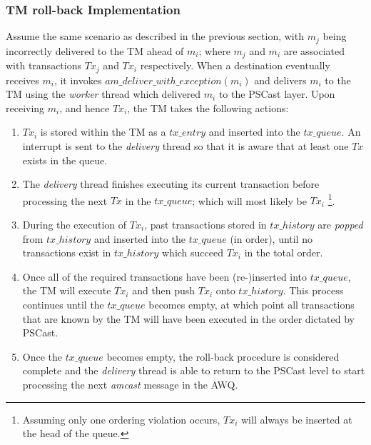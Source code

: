     \subsubsection*{TM roll-back Implementation}
    Assume the same scenario as described in the previous section, with $m_j$ being incorrectly delivered to the TM ahead of $m_i$; where $m_j$ and $m_i$ are associated with transactions $Tx_j$ and $Tx_i$ respectively.  When a destination eventually receives $m_i$, it invokes $am\_deliver\_with\_exception(m_i)$ and delivers $m_i$ to the TM using the \emph{worker} thread which delivered $m_i$ to the \textsf{PSCast} layer.  Upon receiving $m_i$, and hence $Tx_i$, the TM takes the following actions:
    
    \begin{enumerate}
        \item    $Tx_i$ is stored within the TM as a $tx\_entry$ and inserted into the $tx\_queue$.  An interrupt is sent to the \emph{delivery} thread so that it is aware that at least one $Tx$ exists in the queue.  
        
        \item    The \emph{delivery} thread finishes executing its current transaction before processing the next $Tx$ in the $tx\_queue$; which will most likely be $Tx_i$ \footnote{Assuming only one ordering violation occurs, $Tx_i$ will always be inserted at the head of the queue.}.
        
        \item    During the execution of $Tx_i$, past transactions stored in $tx\_history$ are \emph{popped} from $tx\_history$ and inserted into the $tx\_queue$ (in order), until no transactions exist in $tx\_history$ which succeed $Tx_i$ in the total order.
        
        \item    Once all of the required transactions have been (re-)inserted into $tx\_queue$, the TM will execute $Tx_i$ and then push $Tx_i$ onto $tx\_history$.  This process continues until the $tx\_queue$ becomes empty, at which point all transactions that are known by the TM will have been executed in the order dictated by \textsf{PSCast}.  
        
        \item    Once the $tx\_queue$ becomes empty, the roll-back procedure is considered complete and the \emph{delivery} thread is able to return to the \textsf{PSCast} level to start processing the next \emph{amcast} message in the AWQ.  
    \end{enumerate}        
    
